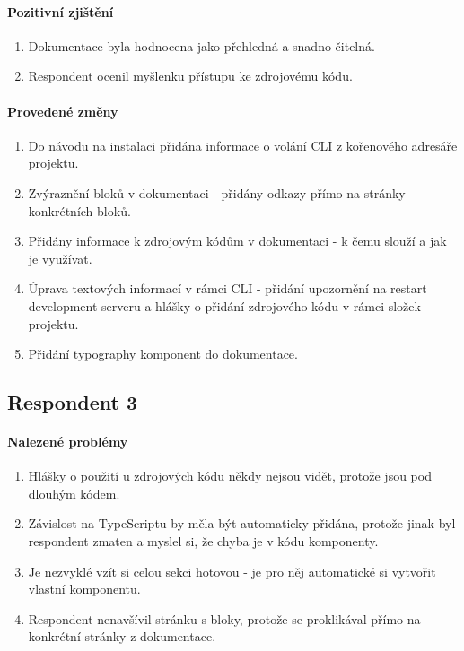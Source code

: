 \paragraph{Pozitivní zjištění}
\begin{enumerate}
  \item Dokumentace byla hodnocena jako přehledná a snadno čitelná.
  \item Respondent ocenil myšlenku přístupu ke zdrojovému kódu.
\end{enumerate}

\paragraph{Provedené změny}
\begin{enumerate}
  \item Do návodu na instalaci přidána informace o volání CLI z kořenového adresáře projektu.
  \item Zvýraznění bloků v dokumentaci - přidány odkazy přímo na stránky konkrétních bloků.
  \item Přidány informace k zdrojovým kódům v dokumentaci - k čemu slouží a jak je využívat.
  \item Úprava textových informací v rámci CLI - přidání upozornění na restart development serveru a hlášky o přidání zdrojového kódu v rámci složek projektu.
  \item Přidání typography komponent do dokumentace.
\end{enumerate}


\subsection{Respondent 3}

\paragraph{Nalezené problémy}
\begin{enumerate}
  \item Hlášky o použití u zdrojových kódu někdy nejsou vidět, protože jsou pod dlouhým kódem.
  \item Závislost na TypeScriptu by měla být automaticky přidána, protože jinak byl respondent zmaten a myslel si, že chyba je v kódu komponenty.
  \item Je nezvyklé vzít si celou sekci hotovou - je pro něj automatické si vytvořit vlastní komponentu.
  \item Respondent nenavšívil stránku s bloky, protože se proklikával přímo na konkrétní stránky z dokumentace.
\end{enumerate}

